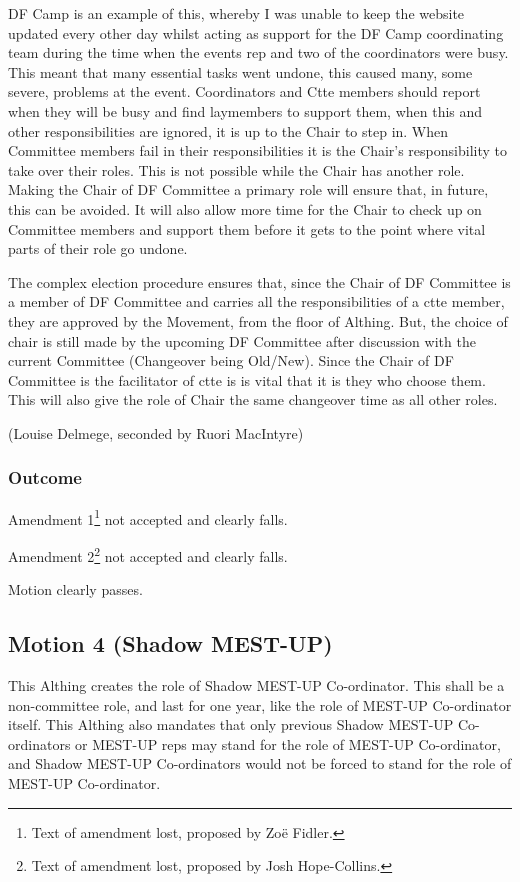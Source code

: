 \documentclass[a4paper, 11pt]{article} %
\begin{document}
DF Camp is an example of this, whereby I was unable to keep the website updated every other day whilst acting as support for the DF Camp coordinating team during the time when the events rep and two of the coordinators were busy. This meant that many essential tasks went undone, this caused many, some severe, problems at the event. Coordinators and Ctte members should report when they will be busy and find laymembers to support them, when this and other responsibilities are ignored, it is up to the Chair to step in.
When Committee members fail in their responsibilities it is the Chair's responsibility to take over their roles. This is not possible while the Chair has another role. Making the Chair of DF Committee a primary role will ensure that, in future, this can be avoided. It will also allow more time for the Chair to check up on Committee members and support them before it gets to the point where vital parts of their role go undone.

The complex election procedure ensures that, since the Chair of DF Committee is a member of DF Committee and carries all the responsibilities of a ctte member, they are approved by the Movement, from the floor of Althing. But, the choice of chair is still made by the upcoming DF Committee after discussion with the current Committee (Changeover being Old/New). Since the Chair of DF Committee is the facilitator of ctte is is vital that it is they who choose them. This will also give the role of Chair the same changeover time as all other roles.

(Louise Delmege, seconded by Ruori MacIntyre)

\subsubsection{Outcome}

Amendment 1\footnote{Text of amendment lost, proposed by Zoë Fidler.} not accepted and clearly falls.

Amendment 2\footnote{Text of amendment lost, proposed by Josh Hope-Collins.} not accepted and clearly falls.

Motion clearly passes.

\subsection{Motion 4 (Shadow MEST-UP)}

This Althing creates the role of Shadow MEST-UP Co-ordinator.  This shall be a non-committee role, and last for one year, like the role of MEST-UP Co-ordinator itself.  This Althing also mandates that only previous Shadow MEST-UP Co-ordinators or MEST-UP reps may stand for the role of MEST-UP Co-ordinator, and Shadow MEST-UP Co-ordinators would not be forced to stand for the role of MEST-UP Co-ordinator.
\end{document}
